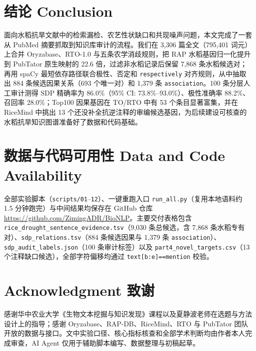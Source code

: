 \documentclass[conference]{IEEEtran}
\begin{document}
\section{结论 Conclusion}

面向水稻抗旱文献中的检索漏检、农艺性状缺口和共现噪声问题，本文完成了一套从 PubMed 摘要抓取到知识库审计的流程。我们在 3,306 篇全文（795,401 词元）上合并 Oryzabase、RTO-1.0 与五条农学消歧规则，把 RAP 水稻基因归一化提升到 PubTator 原生映射的 22.6 倍，过滤非水稻记录后保留 7,868 条水稻候选对；再用 spaCy 最短依存路径联合极性、否定和 \texttt{respectively} 对齐规则，从中抽取出 884 条候选因果关系（693 个唯一对）和 1,379 条 \texttt{association}。100 条分层人工审计测得 SDP 精确率为 86.0\%（95\% CI: 73.8\%--93.0\%）、极性准确率 88.2\%、召回率 28.0\%；Top100 因果基因在 TO/RTO 中有 53 个条目显著富集，并在 RiceMind 中挑出 13 个还没补全抗逆注释的审编候选基因，为后续建设可核查的水稻抗旱知识图谱准备好了数据和代码基础。

\section*{数据与代码可用性 Data and Code Availability}
全部实验脚本（\texttt{scripts/01}--\texttt{12}）、一键重跑入口 \texttt{run\_all.py}（复用本地语料约 1.5 分钟跑完）与中间结果均保存在 GitHub 仓库 \url{https://github.com/ZimingADR/BioNLP}。主要交付表格包含 \texttt{rice\_drought\_sentence\_evidence.tsv}（9,030 条总候选，含 7,868 条水稻专有对）、\texttt{sdp\_relations.tsv}（884 条候选因果与 1,379 条 \texttt{association}）、\texttt{sdp\_audit\_labels.json}（100 条审计标签）以及 \texttt{part4\_novel\_targets.csv}（13 个注释缺口候选），全部字符偏移均通过 \texttt{text[b:e]==mention} 校验。

\section*{Acknowledgment 致谢}
感谢华中农业大学《生物文本挖掘与知识发现》课程以及夏静波老师在选题与方法设计上的指导；感谢 Oryzabase、RAP-DB、RiceMind、RTO 与 PubTator 团队开放的数据与接口。文中实验口径、核心指标核查和全部学术判断均由作者本人完成审查，AI Agent 仅用于辅助脚本编写、数据整理与初稿起草。



\end{document}
